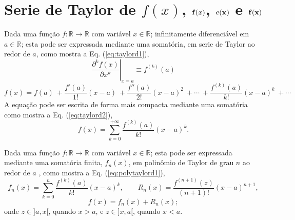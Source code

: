 
\section{Serie de Taylor de $f(x)$, $\VECTOR{f}(x)$, $e(\VECTOR{x})$ e $\VECTOR{f}(\VECTOR{x})$}
\label{def:taylor}


\begin{proposition}\label{prop:taylord}
Dada uma função $f:\mathbb{R}\rightarrow \mathbb{R}$ com variável $x \in \mathbb{R}$;
infinitamente diferenciável em $a \in \mathbb{R}$;
esta pode ser expressada mediante uma somatória, em serie de Taylor 
\cite[pp. 734]{stewart2008calculus} \cite[pp. 281]{telles2015matematica} \cite{Taylor} 
ao redor de $a$, como
mostra a Eq. (\ref{eq:taylord1}),%
\begin{equation}\label{eq:taylord0a}
\left.\frac{\partial^k f(x)}{\partial x^k}\right|_{x=a}\equiv f^{(k)}(a) 
\end{equation}
\begin{equation}\label{eq:taylord1}
  f(x)=f(a)
      ~+\frac{f'(a)}{1!} (x-a)
      ~+\frac{f''(a)}{2!} (x-a)^{2}
      ~+\cdots 
      ~+\frac{f^{(k)}(a)}{k!} (x-a)^{k}
      ~+\cdots 
\end{equation}
A equação pode ser escrita de forma mais compacta mediante uma somatória  como mostra a Eq. (\ref{eq:taylord2}),
\begin{equation}\label{eq:taylord2}
  f(x)=\sum\limits_{k=0}^{+\infty} \frac{f^{(k)}(a)}{k!} (x-a)^{k}.
\end{equation}
\end{proposition}

\begin{proposition}\label{prop:polytaylor}
Dada uma função $f:\mathbb{R}\rightarrow \mathbb{R}$ com variável $x \in \mathbb{R}$;
esta pode ser expressada mediante uma somatória finita, $f_n(x)$, 
em polinômio de Taylor de grau $n$ ao redor de $a$
\cite[pp. 737]{stewart2008calculus} \cite[pp. 285]{telles2015matematica}, 
 como mostra a Eq. (\ref{eq:polytaylord1}),
\begin{equation}\label{eq:polytaylord1}
  f_n(x)=\sum\limits_{k=0}^{n} \frac{f^{(k)}(a)}{k!} (x-a)^{k},
\qquad
R_n(x)=\frac{f^{(n+1)}(z)}{(n+1)!} (x-a)^{n+1},
\end{equation}
\begin{equation}\label{eq:polytaylord2}
f(x)= f_n(x) + R_n(x);
\end{equation}
onde $z \in ]a,x[$, quando $x>a$, e $z \in ]x,a[$, quando $x<a$.
\end{proposition}


